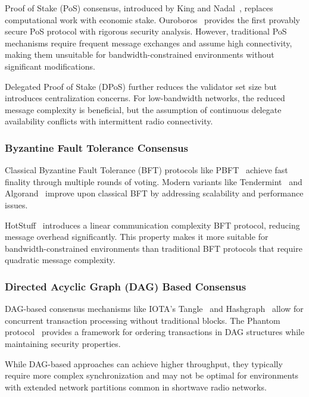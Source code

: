\documentclass[11pt,a4paper]{article}
\begin{document}
Proof of Stake (PoS) consensus, introduced by King and Nadal~\cite{king2012ppcoin}, replaces computational work with economic stake. Ouroboros~\cite{kiayias2017ouroboros} provides the first provably secure PoS protocol with rigorous security analysis. However, traditional PoS mechanisms require frequent message exchanges and assume high connectivity, making them unsuitable for bandwidth-constrained environments without significant modifications.

Delegated Proof of Stake (DPoS) further reduces the validator set size but introduces centralization concerns. For low-bandwidth networks, the reduced message complexity is beneficial, but the assumption of continuous delegate availability conflicts with intermittent radio connectivity.

\subsubsection{Byzantine Fault Tolerance Consensus}

Classical Byzantine Fault Tolerance (BFT) protocols like PBFT~\cite{castro1999practical} achieve fast finality through multiple rounds of voting. Modern variants like Tendermint~\cite{buchman2016tendermint} and Algorand~\cite{gilad2017algorand} improve upon classical BFT by addressing scalability and performance issues.

HotStuff~\cite{yin2019hotstuff} introduces a linear communication complexity BFT protocol, reducing message overhead significantly. This property makes it more suitable for bandwidth-constrained environments than traditional BFT protocols that require quadratic message complexity.

\subsubsection{Directed Acyclic Graph (DAG) Based Consensus}

DAG-based consensus mechanisms like IOTA's Tangle~\cite{popov2018tangle} and Hashgraph~\cite{baird2016swirlds} allow for concurrent transaction processing without traditional blocks. The Phantom protocol~\cite{sompolinsky2018phantom} provides a framework for ordering transactions in DAG structures while maintaining security properties.

While DAG-based approaches can achieve higher throughput, they typically require more complex synchronization and may not be optimal for environments with extended network partitions common in shortwave radio networks.
\end{document}
